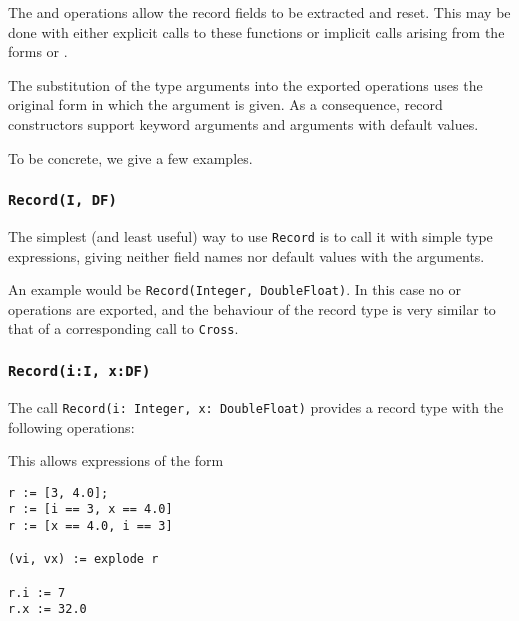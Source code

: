 The  and  operations allow the record
fields to be extracted and reset.  This may be done with either
explicit calls to these functions or implicit calls arising
from the forms  or .

The substitution of the type arguments into the exported operations
uses the original form in which the argument is given.
As a consequence, record constructors support keyword arguments
and arguments with default values.

To be concrete, we give a few examples.

\subsubsection{{\tt Record(I, DF)}}

The simplest (and least useful) way to use \verb"Record"
is to call it with simple type expressions, giving neither
field names nor default values with the arguments.

An example would be \verb"Record(Integer, DoubleFloat)".
In this case no  or  operations are exported,
and the behaviour of
the record type is very similar to that of a corresponding call
to \verb"Cross".



\subsubsection{{\tt Record(i:I, x:DF)}}

The call 
\verb"Record(i: Integer, x: DoubleFloat)"
provides a record type with the following operations:


This allows expressions of the form

\begin{small}%
\begin{verbatim}
r := [3, 4.0];
r := [i == 3, x == 4.0]
r := [x == 4.0, i == 3]

(vi, vx) := explode r

r.i := 7
r.x := 32.0
\end{verbatim}
\end{small}

